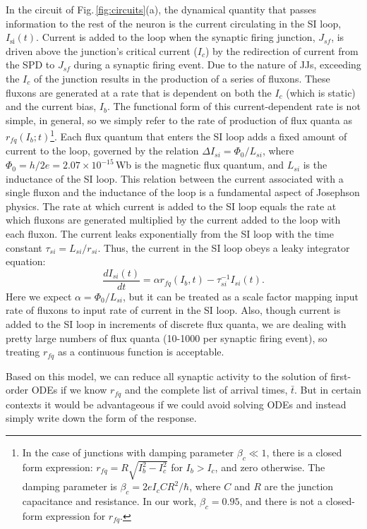\documentclass[]{article}
\begin{document}
In the circuit of Fig.\,\ref{fig:circuits}(a), the dynamical quantity that passes information to the rest of the neuron is the current circulating in the SI loop, $I_{\mathrm{si}}(t)$. Current is added to the loop when the synaptic firing junction, $J_{sf}$, is driven above the junction's critical current ($I_c$) by the redirection of current from the SPD to $J_{sf}$ during a synaptic firing event. Due to the nature of JJs, exceeding the $I_c$ of the junction results in the production of a series of fluxons. These fluxons are generated at a rate that is dependent on both the $I_c$ (which is static) and the current bias, $I_b$. The functional form of this current-dependent rate is not simple, in general, so we simply refer to the rate of production of flux quanta as $r_{fq}(I_b;t)$\footnote{In the case of junctions with damping parameter $\beta_c\ll 1$, there is a closed form expression: $r_{fq} = R\sqrt{I_b^2-I_c^2}$ for $I_b > I_c$, and zero otherwise. The damping parameter is $\beta_c = 2eI_cCR^2/\hbar$, where $C$ and $R$ are the junction capacitance and resistance. In our work, $\beta_c = 0.95$, and there is not a closed-form expression for $r_{fq}$.}. Each flux quantum that enters the SI loop adds a fixed amount of current to the loop, governed by the relation $\Delta I_{si} = \Phi_0/L_{si}$, where $\Phi_{0} = h/2e = 2.07\times 10^{-15}$\,Wb is the magnetic flux quantum, and $L_{si}$ is the inductance of the SI loop. This relation between the current associated with a single fluxon and the inductance of the loop is a fundamental aspect of Josephson physics. The rate at which current is added to the SI loop equals the rate at which fluxons are generated multiplied by the current added to the loop with each fluxon. The current leaks exponentially from the SI loop with the time constant $\tau_{si} = L_{si}/r_{si}$. Thus, the current in the SI loop obeys a leaky integrator equation:
\begin{equation}
\label{eq:leaky_integrator__SI_loop}
\frac{dI_{si}(t)}{dt} = \alpha r_{fq}(I_b,t)-\tau_{si}^{-1}I_{si}(t).
\end{equation}
Here we expect $\alpha = \Phi_0/L_{si}$, but it can be treated as a scale factor mapping input rate of fluxons to input rate of current in the SI loop. Also, though current is added to the SI loop in increments of discrete flux quanta, we are dealing with pretty large numbers of flux quanta (10-1000 per synaptic firing event), so treating $r_{fq}$ as a continuous function is acceptable.

Based on this model, we can reduce all synaptic activity to the solution of first-order ODEs if we know $r_{fq}$ and the complete list of arrival times, $\bar{t}$. But in certain contexts it would be advantageous if we could avoid solving ODEs and instead simply write down the form of the response.
\end{document}
